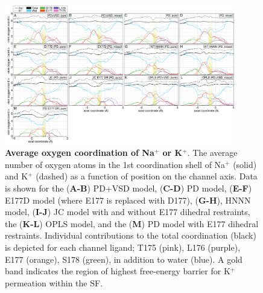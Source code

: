 \begin{refsection}
\begin{figure}[!ptb]
\centering
\includegraphics[width=0.9\textwidth]{nav2/Nav2FigS5}
\caption[Average oxygen coordination of Na$^+$ or K$^+$]{\textbf{Average oxygen coordination of Na$^+$ or K$^+$}. The average number of oxygen atoms in the 1st coordination shell of Na$^+$ (solid) and K$^+$ (dashed) as a function of position on the channel axis. Data is shown for the (\textbf{A-B}) PD+VSD model, (\textbf{C-D}) PD model, (\textbf{E-F}) E177D model (where E177 is replaced with D177), (\textbf{G-H}), HNNN model, (\textbf{I-J}) JC model with and without E177 dihedral restraints, the (\textbf{K-L}) OPLS model, and the (\textbf{M}) PD model with E177 dihedral restraints. Individual contributions to the total coordination (black) is depicted for each channel ligand; T175 (pink), L176 (purple), E177 (orange), S178 (green), in addition to water (blue). A gold band indicates the region of highest free-energy barrier for K$^+$ permeation within the SF.}
\label{fig:nav2figS5}
\end{figure}


\end{refsection}
